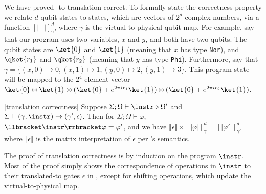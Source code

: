 \newcommand{\transs}[3]{[\!|{#1}|\!]^{#2}_{#3}}

We have proved \oqasm-to-\sqir translation correct. To formally state
the correctness property we relate $d$-qubit \oqasm states to \sqir states, which are vectors of $2^d$ complex numbers, via a function $\transs{-}{d}{\gamma}$, where $\gamma$ is the virtual-to-physical qubit map.
%
For example, say that our program uses two variables, $x$ and $y$, and both have two qubits.
The qubit states are $\ket{0}$ and $\ket{1}$ (meaning that $x$ has type \texttt{Nor}), and $\qket{r_1}$ and $\qket{r_2}$ (meaning that $y$ has type \texttt{Phi}).
Furthermore, say that $\gamma = \{(x,0)\mapsto 0,(x,1)\mapsto 1, (y,0)\mapsto 2, (y,1)\mapsto 3\}$. 
This \oqasm program state will be mapped to the $2^4$-element vector $\ket{0}\otimes \ket{1}\otimes (\ket{0}+e^{2\pi i r_1}\ket{1})\otimes (\ket{0}+e^{2\pi i r_2}\ket{1})$.


\begin{theorem}\label{thm:vqir-compile}\rm[\oqasm translation correctness]
  Suppose $\Sigma; \Omega \vdash \instr \triangleright \Omega'$ and
  $\Sigma \vdash(\gamma,\instr) \to (\gamma',\epsilon)$. %
Then for $\Sigma; \Omega \vdash \varphi$, $\llbracket \instr \rrbracket\varphi=\varphi'$, and we have 
$\llbracket \epsilon \rrbracket \times \transs{\varphi}{d}{\gamma} = \transs{\varphi'}{d}{\gamma'}$ where $\llbracket \epsilon \rrbracket$ is the matrix interpretation of $\epsilon$ per \sqir's semantics.
\end{theorem}

The proof of translation correctness is by induction on the \oqasm program $\instr$. 
Most of the proof simply shows the correspondence of operations in $\instr$ to their translated-to gates $\epsilon$ in \sqir, except for shifting operations, which update the virtual-to-physical map.


